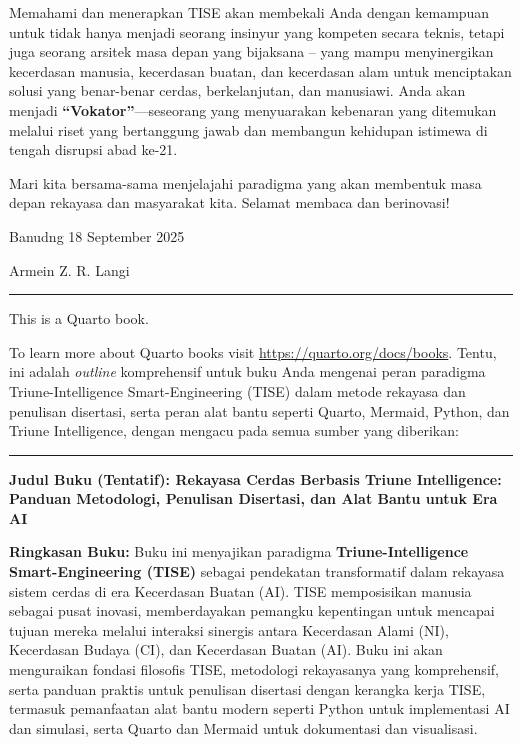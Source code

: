 \documentclass[
  letterpaper,
  DIV=11,
  numbers=noendperiod]{scrreprt}
\begin{document}
Memahami dan menerapkan TISE akan membekali Anda dengan kemampuan untuk
tidak hanya menjadi seorang insinyur yang kompeten secara teknis, tetapi
juga seorang arsitek masa depan yang bijaksana -- yang mampu
menyinergikan kecerdasan manusia, kecerdasan buatan, dan kecerdasan alam
untuk menciptakan solusi yang benar-benar cerdas, berkelanjutan, dan
manusiawi. Anda akan menjadi \textbf{``Vokator''}---seseorang yang
menyuarakan kebenaran yang ditemukan melalui riset yang bertanggung
jawab dan membangun kehidupan istimewa di tengah disrupsi abad ke-21.

Mari kita bersama-sama menjelajahi paradigma yang akan membentuk masa
depan rekayasa dan masyarakat kita. Selamat membaca dan berinovasi!

Banudng 18 September 2025

Armein Z. R. Langi

\begin{center}\rule{0.5\linewidth}{0.5pt}\end{center}

This is a Quarto book.

To learn more about Quarto books visit
\url{https://quarto.org/docs/books}. Tentu, ini adalah \emph{outline}
komprehensif untuk buku Anda mengenai peran paradigma
Triune-Intelligence Smart-Engineering (TISE) dalam metode rekayasa dan
penulisan disertasi, serta peran alat bantu seperti Quarto, Mermaid,
Python, dan Triune Intelligence, dengan mengacu pada semua sumber yang
diberikan:

\begin{center}\rule{0.5\linewidth}{0.5pt}\end{center}

\textbf{Judul Buku (Tentatif): Rekayasa Cerdas Berbasis Triune
Intelligence: Panduan Metodologi, Penulisan Disertasi, dan Alat Bantu
untuk Era AI}

\textbf{Ringkasan Buku:} Buku ini menyajikan paradigma
\textbf{Triune-Intelligence Smart-Engineering (TISE)} sebagai pendekatan
transformatif dalam rekayasa sistem cerdas di era Kecerdasan Buatan
(AI). TISE memposisikan manusia sebagai pusat inovasi, memberdayakan
pemangku kepentingan untuk mencapai tujuan mereka melalui interaksi
sinergis antara Kecerdasan Alami (NI), Kecerdasan Budaya (CI), dan
Kecerdasan Buatan (AI). Buku ini akan menguraikan fondasi filosofis
TISE, metodologi rekayasanya yang komprehensif, serta panduan praktis
untuk penulisan disertasi dengan kerangka kerja TISE, termasuk
pemanfaatan alat bantu modern seperti Python untuk implementasi AI dan
simulasi, serta Quarto dan Mermaid untuk dokumentasi dan visualisasi.
\end{document}
